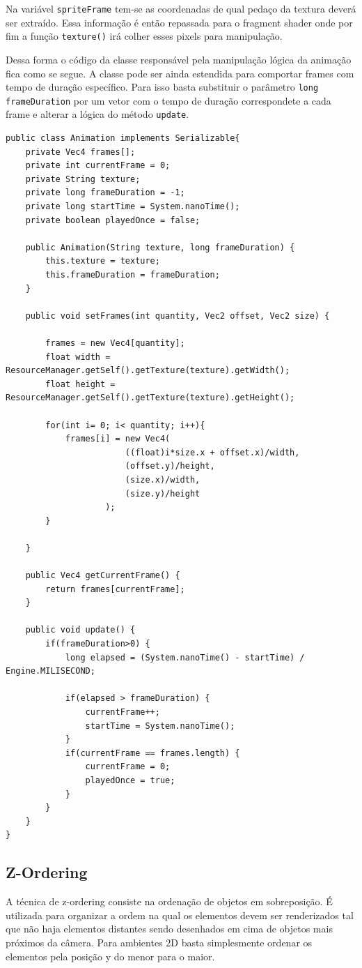 \documentclass[12pt, 
openright, 
oneside, 
a4paper,    
brazil]{facom-ufu-abntex2}
\begin{document}
Na variável \texttt{spriteFrame}  tem-se as coordenadas de qual pedaço da textura deverá ser extraído. Essa informação é então repassada  para o fragment shader onde por fim a função \texttt{texture()} irá colher esses pixels para manipulação.

Dessa forma o código da classe responsável pela manipulação lógica da animação fica como se segue. A classe pode ser ainda estendida para comportar frames com tempo de duração específico. Para isso basta substituir o parâmetro \texttt{long frameDuration} por um vetor com o tempo de duração correspondete a cada frame e alterar a lógica do método \texttt{update}.

\begin{lstlisting}[caption=Classe Animation]
public class Animation implements Serializable{
	private Vec4 frames[];
	private int currentFrame = 0;
	private String texture;
	private long frameDuration = -1;
	private long startTime = System.nanoTime();
	private boolean playedOnce = false;
	
	public Animation(String texture, long frameDuration) {
		this.texture = texture;
		this.frameDuration = frameDuration;
	}

	public void setFrames(int quantity, Vec2 offset, Vec2 size) {
	
		frames = new Vec4[quantity];
		float width = ResourceManager.getSelf().getTexture(texture).getWidth();
		float height = ResourceManager.getSelf().getTexture(texture).getHeight();
		
		for(int i= 0; i< quantity; i++){
			frames[i] = new Vec4(
						((float)i*size.x + offset.x)/width,
						(offset.y)/height,
						(size.x)/width,
						(size.y)/height
					);
		}
		
	}
	
	public Vec4 getCurrentFrame() {
		return frames[currentFrame];
	}
	
	public void update() {
		if(frameDuration>0) {
			long elapsed = (System.nanoTime() - startTime) / Engine.MILISECOND;
			
			if(elapsed > frameDuration) {
				currentFrame++;
				startTime = System.nanoTime();
			}
			if(currentFrame == frames.length) {
				currentFrame = 0;
				playedOnce = true;
			}
		}
	}
}
\end{lstlisting}
\subsection{Z-Ordering}
A técnica de z-ordering consiste na ordenação de objetos em sobreposição. É utilizada para organizar a ordem na qual os elementos devem ser renderizados tal que não haja elementos distantes sendo desenhados em cima de objetos mais próximos da câmera.
Para ambientes 2D basta simplesmente ordenar os elementos pela posição y do menor para o maior. 
\end{document}
